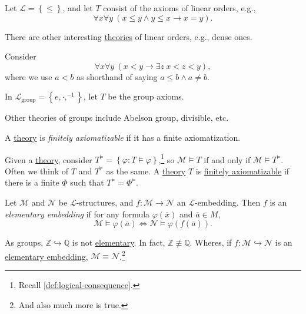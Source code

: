 \begin{eg}
	Let \(\mathcal{L} =\left\{ \leq \right\} \), and let \(T\) consist of the axioms of linear orders, e.g.,
	\[
		\forall x\forall y\ (x \leq y \land y \leq x \to x=y).
	\]
\end{eg}

There are other interesting \hyperref[def:theory]{theories} of linear orders, e.g., dense ones.

\begin{eg}
	Consider
	\[
		\forall x \forall y\ (x < y \to  \exists z\ x < z < y),
	\]
	where we use \(a < b\) as shorthand of saying \(a \leq b \land a \neq b\).
\end{eg}

\begin{eg}[Group]
	In \(\mathcal{L} _{\text{group} } = \left\{ e, \cdot, ^{-1}  \right\} \), let \(T\) be the group axioms.
\end{eg}

Other theories of groups include Abelson group, divisible, etc.

\begin{definition}\label{def:finitely-axiomatizable}
	A \hyperref[def:theory]{theory} is \emph{finitely axiomatizable} if it has a finite axiomatization.
\end{definition}

Given a \hyperref[def:theory]{theory}, consider \(T^{\models } = \left\{ \varphi \colon T \models \varphi \right\}\),\footnote{Recall \autoref{def:logical-consequence}.} so \(\mathcal{M} \models T\) if and only if \(\mathcal{M} \models T^{\models }\). Often we think of \(T\) and \(T^{\models }\) as the same. A \hyperref[def:theory]{theory} \(T\) is \hyperref[def:finitely-axiomatizable]{finitely axiomatizable} if there is a finite \(\Phi \) such that \(T^{\models } = \Phi ^{\models }\).

\begin{definition}\label{def:elementary-embedding}
	Let \(\mathcal{M} \) and \(\mathcal{N} \) be \(\mathcal{L} \)-structures, and \(f\colon \mathcal{M} \to \mathcal{N} \) an \(\mathcal{L} \)-embedding. Then \(f\) is an \emph{elementary embedding} if for any formula \(\varphi (\overline{x} )\) and \(\overline{a} \in M\),
	\[
		\mathcal{M} \models \varphi (\overline{a} )\iff \mathcal{N} \models \varphi (f(\overline{a} )).
	\]
\end{definition}

\begin{eg}
	As groups, \(\mathbb{Z} \hookrightarrow \mathbb{Q} \) is not \hyperref[def:elementary-embedding]{elementary}. In fact, \(\mathbb{Z} \not\equiv \mathbb{Q} \). Wheres, if \(f\colon \mathcal{M} \hookrightarrow \mathcal{N} \) is an \hyperref[def:elementary-embedding]{elementary embedding}, \(\mathcal{M} \equiv \mathcal{N} \).\footnote{And also much more is true.}
\end{eg}

